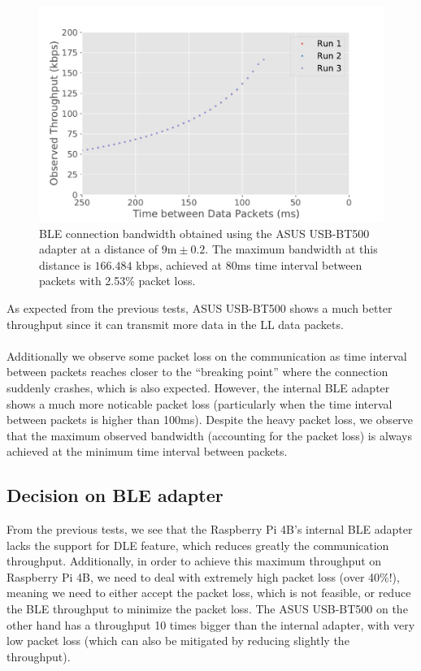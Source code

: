 \begin{figure}[H]
    \centering
    \includegraphics[width=0.75\linewidth]{images/ble-bandwidth-hci0-900cm.pdf}
    \caption[\acs{BLE} connection bandwidth obtained using the ASUS USB-BT500 adapter at a distance of 9m.]{\acs{BLE} connection bandwidth obtained using the ASUS USB-BT500 adapter at a distance of $9\text{m} \pm 0.2$. The maximum bandwidth at this distance is $166.484$ kbps, achieved at 80ms time interval between packets with 2.53\% packet loss.}
    \label{fig:ble-bandwidth-hci0-9m}
\end{figure}

As expected from the previous tests, ASUS USB-BT500 shows a much better throughput since it can transmit more data in the \acs{LL} data packets. 

\paragraph{} Additionally we observe some packet loss on the communication as time interval between packets reaches closer to the ``breaking point'' where the connection suddenly crashes, which is also expected. However, the internal \acs{BLE} adapter shows a much more noticable packet loss (particularly when the time interval between packets is higher than 100ms). Despite the heavy packet loss, we observe that the maximum observed bandwidth (accounting for the packet loss) is always achieved at the minimum time interval between packets.

\subsection{Decision on \acs{BLE} adapter}

From the previous tests, we see that the Raspberry Pi 4B's internal \acs{BLE} adapter lacks the support for \acs{DLE} feature, which reduces greatly the communication throughput. Additionally, in order to achieve this maximum throughput on Raspberry Pi 4B, we need to deal with extremely high packet loss (over 40\%!), meaning we need to either accept the packet loss, which is not feasible, or reduce the \acs{BLE} throughput to minimize the packet loss. The ASUS USB-BT500 on the other hand has a throughput 10 times bigger than the internal adapter, with very low packet loss (which can also be mitigated by reducing slightly the throughput).

